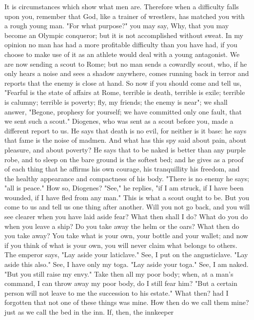\documentclass[a4paper]{article}
\begin{document}
    It is circumstances which show what men are. Therefore when a difficulty
falls upon you, remember that God, like a trainer of wrestlers, has matched you
with a rough young man. "For what purpose?" you may say, Why, that you may
become an Olympic conqueror; but it is not accomplished without sweat. In my
opinion no man has had a more profitable difficulty than you have had, if you
choose to make use of it as an athlete would deal with a young antagonist. We
are now sending a scout to Rome; but no man sends a cowardly scout, who, if he
only hears a noise and sees a shadow anywhere, comes running back in terror and
reports that the enemy is close at hand. So now if you should come and tell us,
"Fearful is the state of affairs at Rome, terrible is death, terrible is exile;
terrible is calumny; terrible is poverty; fly, my friends; the enemy is near";
we shall answer, "Begone, prophesy for yourself; we have committed only one
fault, that we sent such a scout."
    Diogenes, who was sent as a scout before you, made a different report to
us. He says that death is no evil, for neither is it base: he says that fame is
the noise of madmen. And what has this spy said about pain, about pleasure, and
about poverty? He says that to be naked is better than any purple robe, and to
sleep on the bare ground is the softest bed; and he gives as a proof of each
thing that he affirms his own courage, his tranquillity his freedom, and the
healthy appearance and compactness of his body. "There is no enemy he says;
"all is peace." How so, Diogenes? "See," he replies, "if I am struck, if I have
been wounded, if I have fled from any man." This is what a scout ought to be.
But you come to us and tell us one thing after another. Will you not go back,
and you will see clearer when you have laid aside fear?
    What then shall I do? What do you do when you leave a ship? Do you take
away the helm or the oars? What then do you take away? You take what is your
own, your bottle and your wallet; and now if you think of what is your own, you
will never claim what belongs to others. The emperor says, "Lay aside your
laticlave." See, I put on the angusticlave. "Lay aside this also." See, I have
only my toga. "Lay aside your toga." See, I am naked. "But you still raise my
envy." Take then all my poor body; when, at a man's command, I can throw away
my poor body, do I still fear him?
    "But a certain person will not leave to me the succession to his estate."
What then? had I forgotten that not one of these things was mine. How then do
we call them mine? just as we call the bed in the inn. If, then, the innkeeper
\end{document}
